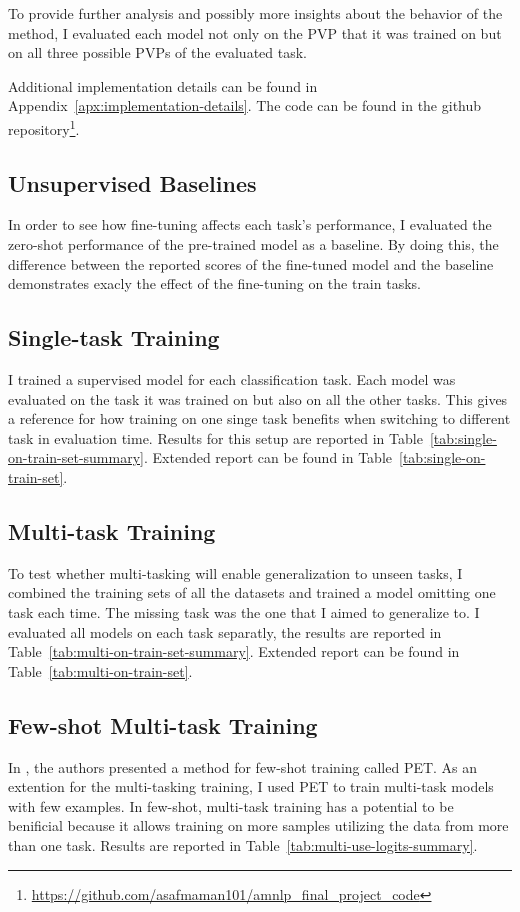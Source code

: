 \documentclass[11pt,a4paper]{article}
\begin{document}
To provide further analysis and possibly more insights about the behavior of the method, I evaluated each model not only on the PVP that it was trained on but on all three possible PVPs of the evaluated task.

Additional implementation details can be found in Appendix~\ref{apx:implementation-details}.
The code can be found in the github repository\footnote{\url{https://github.com/asafmaman101/amnlp_final_project_code}}.

\subsection{Unsupervised Baselines}
In order to see how fine-tuning affects each task's performance, I evaluated the zero-shot performance of the pre-trained model as a baseline.
By doing this, the difference between the reported scores of the fine-tuned model and the baseline demonstrates exacly the effect of the fine-tuning on the train tasks.

\subsection{Single-task Training}
I trained a supervised model for each classification task.
Each model was evaluated on the task it was trained on but also on all the other tasks.
This gives a reference for how training on one singe task benefits when switching to different task in evaluation time.
Results for this setup are reported in Table~\ref{tab:single-on-train-set-summary}.
Extended report can be found in Table~\ref{tab:single-on-train-set}.

\subsection{Multi-task Training}
To test whether multi-tasking will enable generalization to unseen tasks, I combined the training sets of all the datasets and trained a model omitting one task each time.
The missing task was the one that I aimed to generalize to.
I evaluated all models on each task separatly, the results are reported in Table~\ref{tab:multi-on-train-set-summary}.
Extended report can be found in Table~\ref{tab:multi-on-train-set}.

\subsection{Few-shot Multi-task Training}
In \citet{schick2020exploiting}, the authors presented a method for few-shot training called PET.
As an extention for the multi-tasking training, I used PET to train multi-task models with few examples.
In few-shot, multi-task training has a potential to be benificial because it allows training on more samples utilizing the data from more than one task.
Results are reported in Table~\ref{tab:multi-use-logits-summary}.
\end{document}
